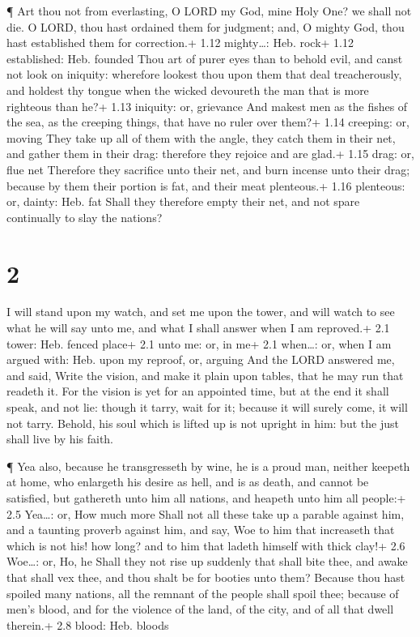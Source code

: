  ¶ Art thou not from everlasting, O LORD my God, mine Holy
One? we shall not die. O LORD, thou hast ordained them for judgment;
and, O mighty God, thou hast established them for correction.+ 1.12
mighty\ldots: Heb. rock+ 1.12 established: Heb. founded 
Thou art of purer eyes than to behold evil, and canst not look on
iniquity: wherefore lookest thou upon them that deal treacherously, and
holdest thy tongue when the wicked devoureth the man that is more
righteous than he?+ 1.13 iniquity: or, grievance  And
makest men as the fishes of the sea, as the creeping things, that have
no ruler over them?+ 1.14 creeping: or, moving  They take
up all of them with the angle, they catch them in their net, and gather
them in their drag: therefore they rejoice and are glad.+ 1.15 drag: or,
flue net  Therefore they sacrifice unto their net, and burn
incense unto their drag; because by them their portion is fat, and their
meat plenteous.+ 1.16 plenteous: or, dainty: Heb. fat 
Shall they therefore empty their net, and not spare continually to slay
the nations?

\hypertarget{section-1}{%
\section{2}\label{section-1}}

 I will stand upon my watch, and set me upon the tower, and
will watch to see what he will say unto me, and what I shall answer when
I am reproved.+ 2.1 tower: Heb. fenced place+ 2.1 unto me: or, in me+
2.1 when\ldots: or, when I am argued with: Heb. upon my reproof, or,
arguing  And the LORD answered me, and said, Write the
vision, and make it plain upon tables, that he may run that readeth it.
 For the vision is yet for an appointed time, but at the end
it shall speak, and not lie: though it tarry, wait for it; because it
will surely come, it will not tarry.  Behold, his soul which
is lifted up is not upright in him: but the just shall live by his
faith.

 ¶ Yea also, because he transgresseth by wine, he is a proud
man, neither keepeth at home, who enlargeth his desire as hell, and is
as death, and cannot be satisfied, but gathereth unto him all nations,
and heapeth unto him all people:+ 2.5 Yea\ldots: or, How much more
 Shall not all these take up a parable against him, and a
taunting proverb against him, and say, Woe to him that increaseth that
which is not his! how long? and to him that ladeth himself with thick
clay!+ 2.6 Woe\ldots: or, Ho, he  Shall they not rise up
suddenly that shall bite thee, and awake that shall vex thee, and thou
shalt be for booties unto them?  Because thou hast spoiled
many nations, all the remnant of the people shall spoil thee; because of
men's blood, and for the violence of the land, of the city, and of all
that dwell therein.+ 2.8 blood: Heb. bloods

